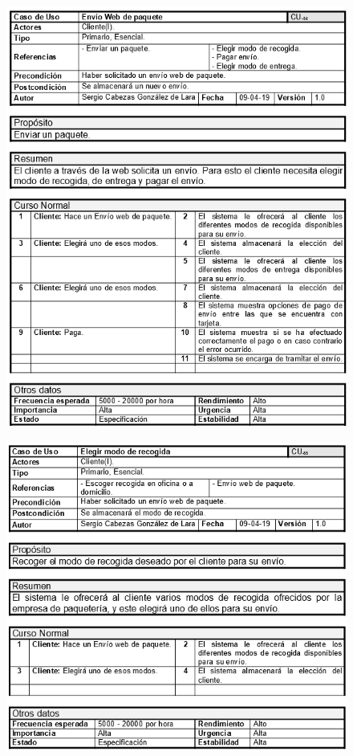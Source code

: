 \begin{figure}[H]
	\centering
	\includegraphics[width=16cm]{54}
\end{figure}
\begin{figure}[H]
	\centering
	\includegraphics[width=16cm]{55}
\end{figure}
